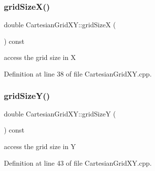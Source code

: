 \hypertarget{class_d_d4hep_1_1_geometry_1_1_cartesian_grid_x_y_abb349f13ff34de095c5c0ada99401986}{}\label{class_d_d4hep_1_1_geometry_1_1_cartesian_grid_x_y_abb349f13ff34de095c5c0ada99401986} 
\subsubsection{\texorpdfstring{grid\+Size\+X()}{gridSizeX()}}
{\footnotesize\ttfamily double Cartesian\+Grid\+X\+Y\+::grid\+SizeX (\begin{DoxyParamCaption}{ }\end{DoxyParamCaption}) const}



access the grid size in X 



Definition at line 38 of file Cartesian\+Grid\+X\+Y.\+cpp.

\hypertarget{class_d_d4hep_1_1_geometry_1_1_cartesian_grid_x_y_ab87bec1a942c778eb54fa1fe9b71fc26}{}\label{class_d_d4hep_1_1_geometry_1_1_cartesian_grid_x_y_ab87bec1a942c778eb54fa1fe9b71fc26} 
\subsubsection{\texorpdfstring{grid\+Size\+Y()}{gridSizeY()}}
{\footnotesize\ttfamily double Cartesian\+Grid\+X\+Y\+::grid\+SizeY (\begin{DoxyParamCaption}{ }\end{DoxyParamCaption}) const}



access the grid size in Y 



Definition at line 43 of file Cartesian\+Grid\+X\+Y.\+cpp.

\hypertarget{class_d_d4hep_1_1_geometry_1_1_cartesian_grid_x_y_a59cd42f0a2ae823737f5b2b54e5224a1}{}\label{class_d_d4hep_1_1_geometry_1_1_cartesian_grid_x_y_a59cd42f0a2ae823737f5b2b54e5224a1} 
